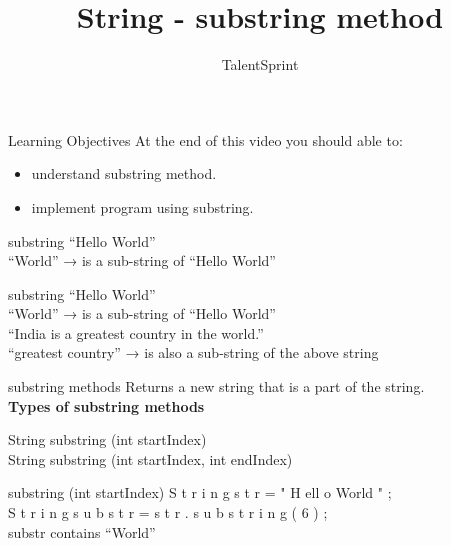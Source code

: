 \documentclass[aspectratio=169,14pt,usenames,dvipsnames]{beamer}
\title[String - substring method]{String - substring method}
\newcommand\tab[1][1cm]{\hspace*{#1}}
\begin{document}
{\1
\begin{frame} \vspace{35pt}

\subtitle{TalentSprint}
\maketitle
\end{frame}
}

\begin{frame}{Learning Objectives}
At the end of this video you should able to:
\begin{itemize}
\item understand substring method.
\item implement program using substring.
\end{itemize}
\end{frame}

\begin{frame}{substring}
“Hello World”\\
“World” → is a sub-string of “Hello World”\\
\end{frame}


\begin{frame}{substring}
“Hello World”\\
“World” → is a sub-string of “Hello World”\\
\vspace{1em}
“India is a greatest country in the world.”\\
“greatest country” → is also a sub-string of the above
string\\
\end{frame}


\begin{frame}{substring methods}
Returns a new string that is a part of the string.\\
\vspace{1em}
\textbf{Types of substring methods}
\begin{center}
    String substring (int startIndex)\\
\tab \tab \hspace{1.2em}  String substring (int startIndex, int endIndex)\\
\end{center}
\end{frame}


\begin{frame}{substring (int startIndex)}
\tab \tab S t r i n g s t r = " H ell o World " ;\\
\tab \tab S t r i n g s u b s t r = s t r . s u b s t r i n g ( 6 ) ;\\
\vspace{1.5em}
\tab \tab \tab \tab \tab substr contains “World”
\end{frame}
\end{document}
